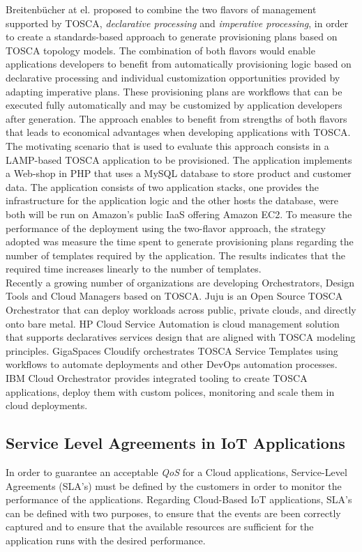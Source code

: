 Breitenb\"{u}cher at el. \cite{breitenbucher2014combining} proposed to combine the two flavors of management supported by TOSCA, \textit{declarative processing} and
\textit{imperative processing}, in order to create a standards-based approach to generate provisioning plans based on TOSCA topology models. The
combination of both flavors would enable applications developers to benefit from automatically provisioning logic based on declarative processing and
individual customization opportunities provided by adapting imperative plans. These provisioning plans are workflows that can be executed fully automatically and
may be customized by application developers after generation. The approach enables to benefit from strengths of both flavors that leads to economical advantages
when developing applications with TOSCA. The motivating scenario that is used to evaluate this approach consists in a LAMP-based TOSCA application to be provisioned.
The application implements a Web-shop in PHP that uses a MySQL database to store product and customer data. The application consists of two application stacks, one provides
the infrastructure for the application logic and the other hosts the database, were both will be run on Amazon's public IaaS offering Amazon EC2. To measure the performance
of the deployment using the two-flavor approach, the strategy adopted was measure the time spent to generate provisioning plans regarding the number of templates required
by the application. The results indicates that the required time increases linearly to the number of templates.\\

Recently a growing number of organizations are developing Orchestrators, Design Tools and Cloud Managers based on TOSCA. Juju is an Open Source TOSCA Orchestrator that
can deploy workloads across public, private clouds, and directly onto bare metal. HP Cloud Service Automation is cloud management solution that supports declaratives
services design that are aligned with TOSCA modeling principles. GigaSpaces Cloudify orchestrates TOSCA Service Templates using workflows to automate deployments and other
DevOps automation processes. IBM Cloud Orchestrator provides integrated tooling to create TOSCA applications, deploy them with custom polices, monitoring and scale them in cloud deployments.\\

\subsection{Service Level Agreements in IoT Applications}
\label{sub:subsection label}
In order to guarantee an acceptable \textit{QoS} for a Cloud applications, Service-Level Agreements (SLA's) must be defined by the customers in order to monitor the performance of the
applications. Regarding Cloud-Based IoT applications, SLA's can be defined with two purposes, to ensure that the events are been correctly captured and to ensure that the available resources
are sufficient for the application runs with the desired performance.\\

